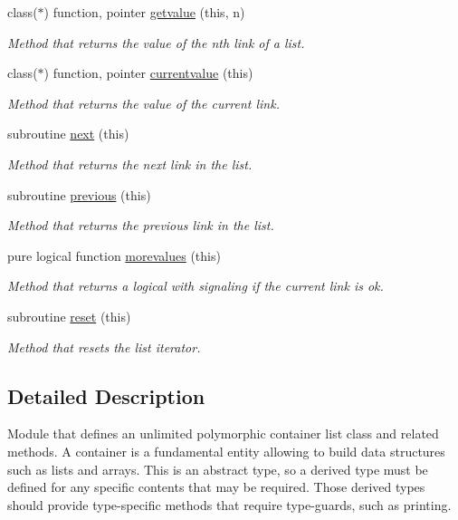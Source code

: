 \begin{DoxyCompactItemize}
class($\ast$) function, pointer \mbox{\hyperlink{namespaceabstract__linkedlist__mod_a3c3ad627fd9f87da9831c53802975104}{getvalue}} (this, n)
\begin{DoxyCompactList}\small\item\em Method that returns the value of the nth link of a list. \end{DoxyCompactList}\item 
class($\ast$) function, pointer \mbox{\hyperlink{namespaceabstract__linkedlist__mod_a87a81a4be29c8d4e8d2fb0d02247033b}{currentvalue}} (this)
\begin{DoxyCompactList}\small\item\em Method that returns the value of the current link. \end{DoxyCompactList}\item 
subroutine \mbox{\hyperlink{namespaceabstract__linkedlist__mod_a576f148096561712d6ddd8c848bc7c4b}{next}} (this)
\begin{DoxyCompactList}\small\item\em Method that returns the next link in the list. \end{DoxyCompactList}\item 
subroutine \mbox{\hyperlink{namespaceabstract__linkedlist__mod_a0b36d862899c5a40cb98bef4ffd5e2f4}{previous}} (this)
\begin{DoxyCompactList}\small\item\em Method that returns the previous link in the list. \end{DoxyCompactList}\item 
pure logical function \mbox{\hyperlink{namespaceabstract__linkedlist__mod_a91ec7f6e570a87769ebb3d11b33f577e}{morevalues}} (this)
\begin{DoxyCompactList}\small\item\em Method that returns a logical with signaling if the current link is ok. \end{DoxyCompactList}\item 
subroutine \mbox{\hyperlink{namespaceabstract__linkedlist__mod_a46ff8b8a3ab81610eb47d72d742778c3}{reset}} (this)
\begin{DoxyCompactList}\small\item\em Method that resets the list iterator. \end{DoxyCompactList}\end{DoxyCompactItemize}


\subsection{Detailed Description}
Module that defines an unlimited polymorphic container list class and related methods. A container is a fundamental entity allowing to build data structures such as lists and arrays. This is an abstract type, so a derived type must be defined for any specific contents that may be required. Those derived types should provide type-\/specific methods that require type-\/guards, such as printing. 

